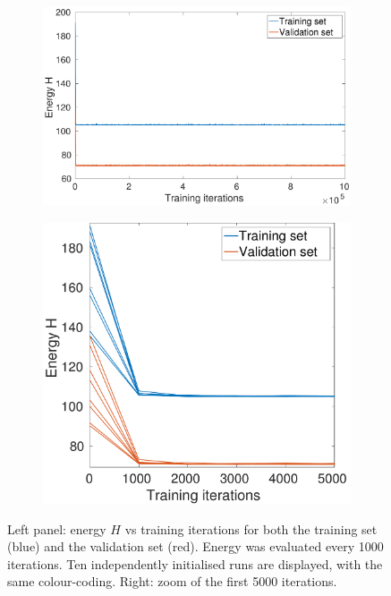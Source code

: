 \documentclass[12pt,titlepage]{article}
\begin{document}
\vspace*{-0.5cm}
\begin{figure}[H]
\centering
    \begin{subfigure}[b]{0.57\textwidth}
        \includegraphics[width=\textwidth]{../Figures/noHL_energy.pdf}
        \caption{}
    \end{subfigure} %
    \hfill %
    \begin{subfigure}[b]{0.39\textwidth}
        \includegraphics[width=\textwidth]{../Figures/noHL_energy_part.pdf}
        \caption{}
    \end{subfigure} %
    \vspace*{-0.2cm}
\caption{\footnotesize Left panel: energy $H$ vs training iterations for both the training set (blue) and the validation set (red). Energy was evaluated every 1000 iterations. Ten independently initialised runs are displayed, with the same colour-coding. Right: zoom of the first 5000 iterations.}
\label{fig:2a}
\end{figure}
\end{document}
